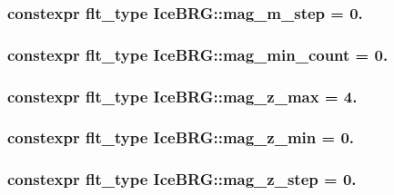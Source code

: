 \subsubsection[{mag\+\_\+m\+\_\+step}]{\setlength{\rightskip}{0pt plus 5cm}constexpr {\bf flt\+\_\+type} Ice\+B\+R\+G\+::mag\+\_\+m\+\_\+step = 0.}\label{namespaceIceBRG_a0dc0ffd6663af1f01df1e07c25556a13}
\hypertarget{namespaceIceBRG_a64cda385b1f9579a049d1d58d0844611}{}
\subsubsection[{mag\+\_\+min\+\_\+count}]{\setlength{\rightskip}{0pt plus 5cm}constexpr {\bf flt\+\_\+type} Ice\+B\+R\+G\+::mag\+\_\+min\+\_\+count = 0.}\label{namespaceIceBRG_a64cda385b1f9579a049d1d58d0844611}
\hypertarget{namespaceIceBRG_ac405728ac8f0dd2dc9ef8e4e332c48a2}{}
\subsubsection[{mag\+\_\+z\+\_\+max}]{\setlength{\rightskip}{0pt plus 5cm}constexpr {\bf flt\+\_\+type} Ice\+B\+R\+G\+::mag\+\_\+z\+\_\+max = 4.}\label{namespaceIceBRG_ac405728ac8f0dd2dc9ef8e4e332c48a2}
\hypertarget{namespaceIceBRG_ad984585cf2116d7dba1d297d6fa7d3f1}{}
\subsubsection[{mag\+\_\+z\+\_\+min}]{\setlength{\rightskip}{0pt plus 5cm}constexpr {\bf flt\+\_\+type} Ice\+B\+R\+G\+::mag\+\_\+z\+\_\+min = 0.}\label{namespaceIceBRG_ad984585cf2116d7dba1d297d6fa7d3f1}
\hypertarget{namespaceIceBRG_a1394dcf9ab9fe4a99d8315787e81a2eb}{}
\subsubsection[{mag\+\_\+z\+\_\+step}]{\setlength{\rightskip}{0pt plus 5cm}constexpr {\bf flt\+\_\+type} Ice\+B\+R\+G\+::mag\+\_\+z\+\_\+step = 0.}\label{namespaceIceBRG_a1394dcf9ab9fe4a99d8315787e81a2eb}
\hypertarget{namespaceIceBRG_aa73b527a69b3a11b2dcb1d5c1b1d5ef1}{}
